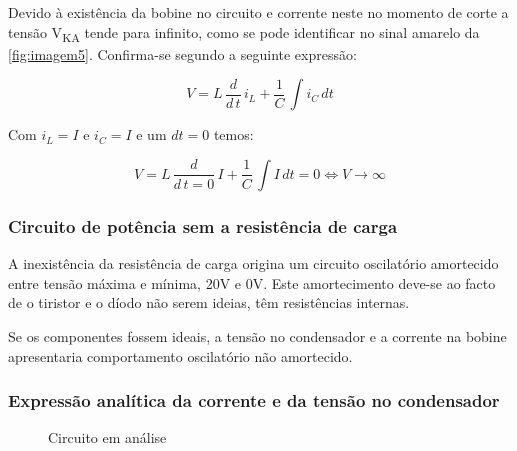 \documentclass[a4paper,11pt]{article}
\numberwithin{equation}{section}
\begin{document}
Devido à existência da bobine no circuito e corrente neste no momento de corte a tensão  V\textsubscript{KA} tende para infinito, como se pode identificar no sinal amarelo da \autoref{fig:imagem5}. Confirma-se segundo a seguinte expressão:
 
 \begin{equation}
 	\label{eq:ex_1}
 	V = L\,\frac{d}{d\,t}\,i_L + \frac{1}{C}\,\int i_C\,dt
 \end{equation}

Com $i_L = I$ e $i_C = I$ e um $dt = 0$ temos:

 \begin{equation}
 	\label{eq:ex_2}
 	V = L\,\frac{d}{d\,t = 0}\,I + \frac{1}{C}\,\int I\,dt = 0 \Leftrightarrow V \rightarrow \infty
 \end{equation}	

\subsubsection{Circuito de potência sem a resistência de carga}
A inexistência da resistência de carga origina um circuito oscilatório amortecido entre tensão máxima e mínima, 20V e 0V. Este amortecimento deve-se ao facto de o tiristor e o díodo não serem ideias, têm resistências internas.

Se os componentes fossem ideais, a tensão no condensador e a corrente na bobine apresentaria comportamento oscilatório não amortecido.

\subsubsection{Expressão analítica da corrente e da tensão no condensador}


	\begin{figure}[h]
		\centering

		\caption{Circuito em análise}
		\label{fig:circuit_e18}
	\end{figure}
\end{document}
